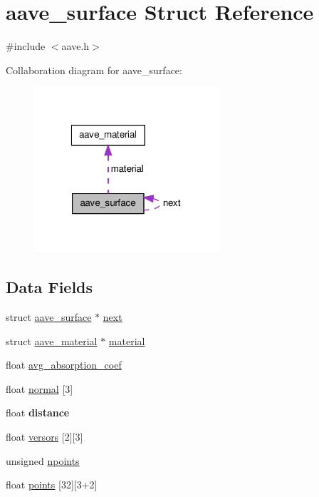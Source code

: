 \hypertarget{structaave__surface}{\section{aave\-\_\-surface Struct Reference}
\label{structaave__surface}
}


{\ttfamily \#include $<$aave.\-h$>$}



Collaboration diagram for aave\-\_\-surface\-:\nopagebreak
\begin{figure}[H]
\begin{center}
\leavevmode
\includegraphics[width=195pt]{structaave__surface__coll__graph}
\end{center}
\end{figure}
\subsection*{Data Fields}
\begin{DoxyCompactItemize}
\item 
struct \hyperlink{structaave__surface}{aave\-\_\-surface} $\ast$ \hyperlink{structaave__surface_a4437c02a050c5cd3d99272bb3d5ebd7e}{next}
\item 
struct \hyperlink{structaave__material}{aave\-\_\-material} $\ast$ \hyperlink{structaave__surface_a6dfe11d4b9e97f9167a39669513a4b0a}{material}
\item 
float \hyperlink{structaave__surface_a9a12af46ca455c786a791ce484afdbd4}{avg\-\_\-absorption\-\_\-coef}
\item 
float \hyperlink{structaave__surface_a8b5aa68de342d90a056663c90fc31f28}{normal} \mbox{[}3\mbox{]}
\item 
\hypertarget{structaave__surface_a6a8499e479693fd5915cc070497b1701}{float {\bfseries distance}}\label{structaave__surface_a6a8499e479693fd5915cc070497b1701}

\item 
float \hyperlink{structaave__surface_a8724b22799063ed44d691a845f68f768}{versors} \mbox{[}2\mbox{]}\mbox{[}3\mbox{]}
\item 
unsigned \hyperlink{structaave__surface_a30f288c41c0a36c0a2492ab100e6c05c}{npoints}
\item 
float \hyperlink{structaave__surface_a6bd0e3127c052c7cf3ffa49480acda83}{points} \mbox{[}32\mbox{]}\mbox{[}3+2\mbox{]}
\end{DoxyCompactItemize}


